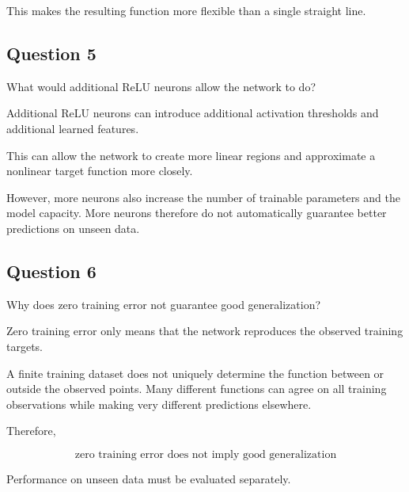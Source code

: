 \documentclass[10pt]{article}
\begin{document}
This makes the resulting function more flexible than a single straight line.

\par\endgroup

\subsection*{Question 5}
What would additional ReLU neurons allow the network to do?

\begingroup\color{red}

Additional ReLU neurons can introduce additional activation thresholds and additional learned features.

This can allow the network to create more linear regions and approximate a nonlinear target function more closely.

However, more neurons also increase the number of trainable parameters and the model capacity. More neurons therefore do not automatically guarantee better predictions on unseen data.

\par\endgroup

\subsection*{Question 6}
Why does zero training error not guarantee good generalization?

\begingroup\color{red}

Zero training error only means that the network reproduces the observed training targets.

A finite training dataset does not uniquely determine the function between or outside the observed points. Many different functions can agree on all training observations while making very different predictions elsewhere.

Therefore,

\[
\text{zero training error does not imply good generalization}
\]

Performance on unseen data must be evaluated separately.

\par\endgroup
\end{document}
